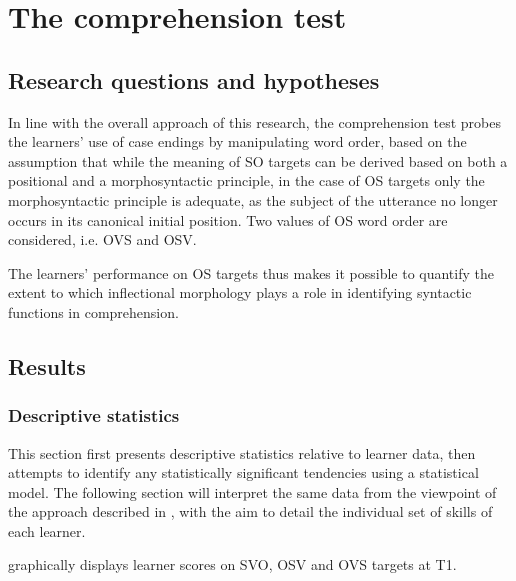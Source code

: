 \chapter{The comprehension test}\label{sec:4}

\section{Research questions and hypotheses}\label{sec:05:1}

In line with the overall approach of this research, the comprehension test probes the learners' use of case endings by manipulating word order, based on the assumption that while the meaning of SO targets can be derived based on both a positional and a morphosyntactic principle, in the case of OS targets only the morphosyntactic principle is adequate, as the subject of the utterance no longer occurs in its canonical initial position. Two values of OS word order are considered, i.e. OVS and OSV.

The learners’ performance on OS targets thus makes it possible to quantify the extent to which inflectional morphology plays a role in identifying syntactic functions in comprehension.

\section{Results}\label{sec:05:2}
\subsection{Descriptive statistics}\label{sec:05:2.1}

This section first presents descriptive statistics relative to learner data, then attempts to identify any statistically significant tendencies using a statistical model. The following section will interpret the same data from the viewpoint of the approach described in , with the aim to detail the individual set of skills of each learner.

 graphically displays learner scores on SVO, OSV and OVS targets at T1.

